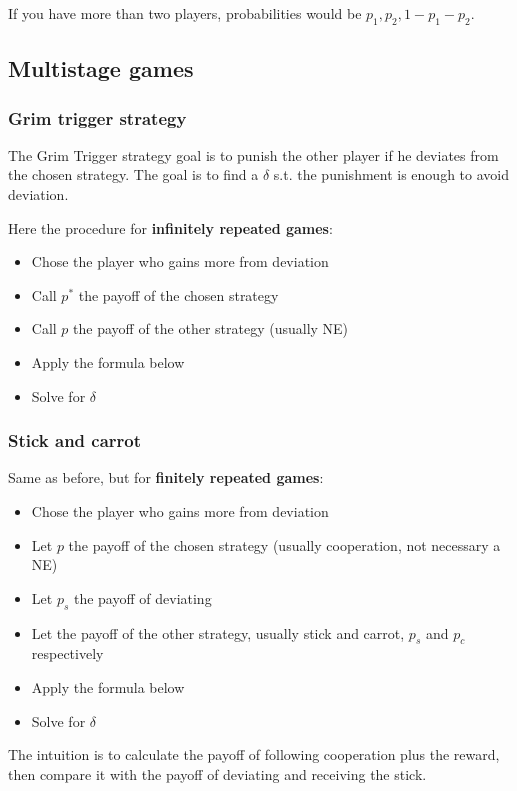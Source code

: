 If you have more than two players, probabilities would be $p_1, p_2, 1-p_1 - p_2$.

\subsection*{Multistage games}

\subsubsection*{Grim trigger strategy}
The Grim Trigger strategy goal is to punish the other player if he deviates from the chosen strategy. The goal is to find a $\delta$ s.t. the punishment is enough to avoid deviation.

Here the procedure for \textbf{infinitely repeated games}:
\begin{itemize}
    \item Chose the player who gains more from deviation
    \item Call $p^*$ the payoff of the chosen strategy
    \item Call $p$ the payoff of the other strategy (usually NE)
    \item Apply the formula below
    \item Solve for $\delta$
\end{itemize}

\subsubsection*{Stick and carrot}
Same as before, but for \textbf{finitely repeated games}:
\begin{itemize}
    \item Chose the player who gains more from deviation
    \item Let $p$ the payoff of the chosen strategy (usually cooperation, not necessary a NE)
    \item Let $p_s$ the payoff of deviating
    \item Let the payoff of the other strategy, usually stick and carrot, $p_s$ and $p_c$ respectively
    \item Apply the formula below
    \item Solve for $\delta$
\end{itemize}
The intuition is to calculate the payoff of following cooperation plus the reward, then compare it with the payoff of deviating and receiving the stick.

